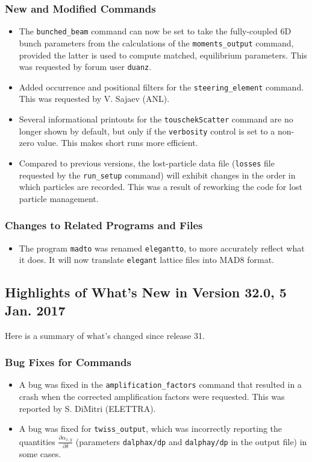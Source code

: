 \documentclass[11pt]{article}
\begin{document}
\subsubsection{New and Modified Commands}
\begin{itemize}
\item The \verb|bunched_beam| command can now be set to take the fully-coupled 6D bunch parameters from the calculations of the
  \verb|moments_output| command, provided the latter is used to compute matched, equilibrium parameters.
  This was requested by forum user \verb|duanz|.
\item Added occurrence and positional filters for the \verb|steering_element| command. This was requested by V. Sajaev (ANL).
\item Several informational printouts for the \verb|touschekScatter| command are no longer shown by default, but only if the 
  \verb|verbosity| control is set to a non-zero value. This makes short runs more efficient.
\item Compared to previous versions, the lost-particle data file (\verb|losses| file requested by the \verb|run_setup|
  command) will exhibit changes in the order in which particles are recorded. This was a result of reworking the code for
  lost particle management.
\end{itemize}

\subsubsection{Changes to Related Programs and Files}

\begin{itemize}
\item The program \verb|madto| was renamed \verb|elegantto|, to more accurately reflect what it does.
  It will now translate \verb|elegant| lattice files into MAD8 format.
\end{itemize}

\subsection{Highlights of What's New in Version 32.0, 5 Jan. 2017}

Here is a summary of what's changed since release 31.

\subsubsection{Bug Fixes for Commands}
\begin{itemize}
\item A bug was fixed in the \verb|amplification_factors| command that resulted in a crash when the corrected amplification
  factors were requested. This was reported by S. DiMitri (ELETTRA).
\item A bug was fixed for \verb|twiss_output|, which was incorrectly reporting the quantities $\frac{\partial \alpha_{x,y}}{\partial \delta}$
 (parameters \verb|dalphax/dp| and \verb|dalphay/dp| in the output file) in some cases.
\end{itemize}
\end{document}
